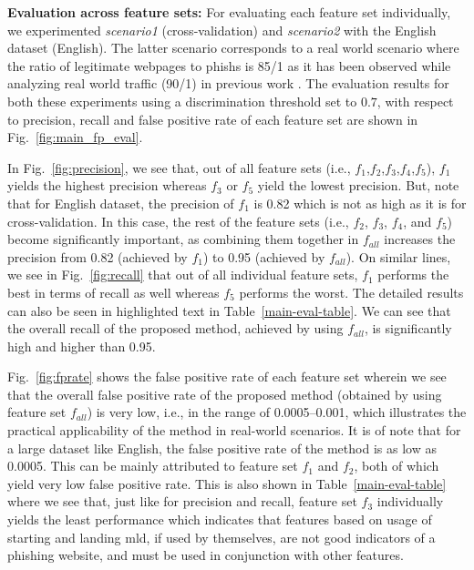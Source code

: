 \documentclass[10pt,conference,compsocconf,letterpaper]{IEEEtran}
\begin{document}
\iffullversion
\textbf{Evaluation across feature sets:} For evaluating each feature set individually, we experimented \textit{scenario1} (cross-validation) and \textit{scenario2} with the English dataset (English). The latter scenario corresponds to a real world scenario where the ratio of legitimate webpages to phishs is 85/1 as it has been observed while analyzing real world traffic (90/1) in previous work \cite{whittaker:2010:large}.
The  evaluation results for both these experiments using a discrimination threshold set to $0.7$, with respect to precision, recall and false positive rate of each feature set are shown in Fig.~\ref{fig:main_fp_eval}.  

In Fig.~\ref{fig:precision}, we see that, out of all feature sets (i.e., $f_1$,$f_2$,$f_3$,$f_4$,$f_5$), $f_1$ yields the highest precision whereas  $f_3$ or  $f_5$ yield the lowest precision. But, note that for English dataset, the precision of $f_1$ is 0.82 which is not as high as it is for cross-validation. In this case, the rest of the feature sets (i.e., $f_2$, $f_3$, $f_4$,  and $f_5$) become significantly important, as combining them together in $f_{all}$ increases the precision from 0.82 (achieved by $f_1$) to 0.95 (achieved by $f_{all}$).   
On similar lines, we see in Fig.~\ref{fig:recall} that out of  all individual feature sets, $f_1$ performs the best in terms of recall as well whereas $f_5$ performs the worst. 
The detailed results can also be seen in highlighted text in Table~\ref{main-eval-table}. We can see that the overall recall of  the proposed method, achieved by using $f_{all}$, is significantly high and higher than 0.95.

Fig.~\ref{fig:fprate} shows the false positive rate of each feature set wherein we see that the overall false positive rate of the proposed method (obtained by using feature set $f_{all}$) is very low, i.e., in the range of 0.0005--0.001, which illustrates the practical applicability of the method in real-world scenarios. It is of note that for a large dataset like English, the false positive rate of the method is as low as 0.0005. This can be mainly attributed to feature set $f_1$ and $f_2$, both of which yield very low false positive rate. 
This is also shown in Table~\ref{main-eval-table} where we see that, just like for precision and recall, feature set $f_3$ individually yields the least performance which indicates that features based on usage of starting and landing mld, if used by themselves, are not good indicators of a phishing website, and must be used in conjunction with other features.
\fi
\end{document}
